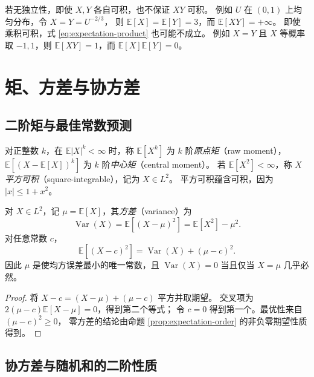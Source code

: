 \documentclass[UTF8,12pt,a4paper,fontset=fandol]{ctexart}
\begin{document}
若无独立性，即使 $X,Y$ 各自可积，也不保证 $XY$ 可积。
例如 $U$ 在 $(0,1)$ 上均匀分布，令 $X=Y=U^{-2/3}$，
则 $\mathbb E[X]=\mathbb E[Y]=3$，而 $\mathbb E[XY]=+\infty$。
即使乘积可积，式 \eqref{eq:expectation-product} 也可能不成立。
例如 $X=Y$ 且 $X$ 等概率取 $-1,1$，则 $\mathbb E[XY]=1$，而
$\mathbb E[X]\mathbb E[Y]=0$。

\section{矩、方差与协方差}
\label{sec:expectation-moments}

\subsection{二阶矩与最佳常数预测}

对正整数 $k$，在 $\mathbb E|X|^k<\infty$ 时，称 $\mathbb E[X^k]$ 为
$k$ 阶\emph{原点矩}（raw moment），
$\mathbb E[(X-\mathbb E[X])^k]$ 为 $k$ 阶\emph{中心矩}（central moment）。
若 $\mathbb E[X^2]<\infty$，称 $X$ \emph{平方可积}（square-integrable），记为 $X\in L^2$。
平方可积蕴含可积，因为 $|x|\leq1+x^2$。

\begin{proposition}[方差分解]
\label{prop:expectation-variance}
对 $X\in L^2$，记 $\mu=\mathbb E[X]$，其\emph{方差}（variance）为
\begin{equation}
  \operatorname{Var}(X)
  =\mathbb E[(X-\mu)^2]
  =\mathbb E[X^2]-\mu^2.
  \label{eq:expectation-variance}
\end{equation}
对任意常数 $c$，
\begin{equation}
  \mathbb E[(X-c)^2]
  =\operatorname{Var}(X)+(\mu-c)^2.
  \label{eq:expectation-best-constant}
\end{equation}
因此 $\mu$ 是使均方误差最小的唯一常数，且
$\operatorname{Var}(X)=0$ 当且仅当 $X=\mu$ 几乎必然。
\end{proposition}

\begin{proof}
将 $X-c=(X-\mu)+(\mu-c)$ 平方并取期望。
交叉项为 $2(\mu-c)\mathbb E[X-\mu]=0$，得到第二个等式；
令 $c=0$ 得到第一个。最优性来自 $(\mu-c)^2\geq0$，
零方差的结论由命题 \ref{prop:expectation-order} 的非负零期望性质得到。
\end{proof}

\subsection{协方差与随机和的二阶性质}
\end{document}
